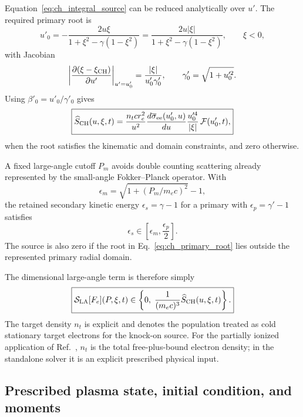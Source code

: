 \documentclass[11pt]{article}
\begin{document}
Equation~\eqref{eq:ch_integral_source} can be reduced analytically over $u'$.  The
required primary root is
\begin{equation}
 u'_0
 =-\frac{2u\xi}{1+\xi^2-\gamma(1-\xi^2)}
 =\frac{2u|\xi|}{1+\xi^2-\gamma(1-\xi^2)},
 \qquad \xi<0,
 \label{eq:ch_primary_root}
\end{equation}
with Jacobian
\begin{equation}
 \left|
 \frac{\partial(\xi-\xi_{\rm CH})}{\partial u'}
 \right|_{u'=u'_0}
 =\frac{|\xi|}{u'_0\gamma'_0},
 \qquad \gamma'_0=\sqrt{1+u_0'^2}.
 \label{eq:ch_delta_jacobian}
\end{equation}
Using $\beta'_0=u'_0/\gamma'_0$ gives
\begin{equation}
 \boxed{
 \widehat S_{\rm CH}(u,\xi,t)
 =\frac{n_t c r_e^2}{u^2}
  \frac{d\overline\sigma_{\rm ee}(u'_0,u)}{du}
  \frac{u_0'^4}{|\xi|}\,
  \mathcal F(u'_0,t),
 }
 \label{eq:ch_reduced_source}
\end{equation}
when the root satisfies the kinematic and domain constraints, and zero otherwise.

A fixed large-angle cutoff $P_m$ avoids double counting scattering already represented
by the small-angle Fokker--Planck operator.  With
\begin{equation}
 \epsilon_m=\sqrt{1+(P_m/m_ec)^2}-1,
\end{equation}
the retained secondary kinetic energy $\epsilon_s=\gamma-1$ for a primary with
$\epsilon_p=\gamma'-1$ satisfies
\begin{equation}
 \epsilon_s\in\left[\epsilon_m,\frac{\epsilon_p}{2}\right].
 \label{eq:ch_energy_range}
\end{equation}
The source is also zero if the root in Eq.~\eqref{eq:ch_primary_root} lies outside the
represented primary radial domain.

The dimensional large-angle term is therefore simply
\begin{equation}
 \boxed{
 \mathcal S_{\rm LA}[F_e](P,\xi,t)
 \in\left\{0,\;\frac{1}{(m_ec)^3}\widehat S_{\rm CH}(u,\xi,t)\right\}.
 }
 \label{eq:large_angle_physical_choices}
\end{equation}
The target density $n_t$ is explicit and denotes the population treated as cold
stationary target electrons for the knock-on source.  For the partially ionized
application of Ref.~\cite{Arnaud2025}, $n_t$ is the total free-plus-bound electron
density; in the standalone solver it is an explicit prescribed physical input.

\subsection{Prescribed plasma state, initial condition, and moments}
\end{document}
